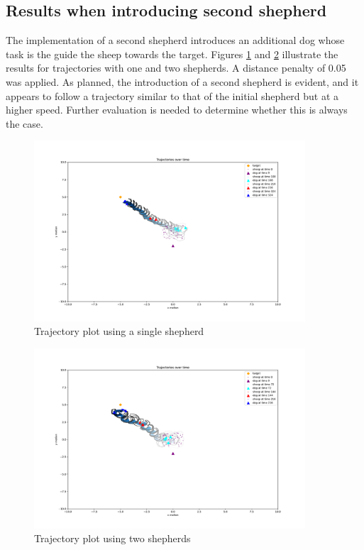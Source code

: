 \subsection{Results when introducing second shepherd}
The implementation of a second shepherd introduces an additional dog whose task is the guide the sheep towards the target. Figures \ref{fig:single-shepherd} and \ref{fig:second-shepherds} illustrate the results for trajectories with one and two shepherds. A distance penalty of 0.05 was applied. As planned, the introduction of a second shepherd is evident, and it appears to follow a trajectory similar to that of the initial shepherd but at a higher speed. Further evaluation is needed to determine whether this is always the case.

\begin{figure}[!h]
    \includegraphics[width=0.9\textwidth]{figures/single-shepherd.pdf}
    \caption{Trajectory plot using a single shepherd}
    \label{fig:single-shepherd}
\end{figure}

\begin{figure}[!h]
    \includegraphics[width=0.9\textwidth]{figures/second-shepherd.pdf}
    \caption{Trajectory plot using two shepherds}
    \label{fig:second-shepherds}
\end{figure}

